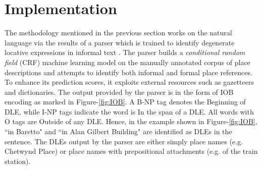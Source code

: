 \documentclass{acm_proc_article-sp}
\begin{document}


\section{Implementation}
The methodology mentioned in the previous section works on the natural language via the results of a parser which is trained to identify degenerate locative expressions in informal text \cite{fei:locative}. 
The parser builds a \textit{conditional random field} (CRF) machine learning model on the manually annotated corpus of place descriptions \cite{tuw} and attempts to identify both informal and formal place references. To enhance its prediction scores, it exploits external resources such as gazetteers and dictionaries. The output provided by the parser is in the form of IOB encoding as marked in Figure-\ref{fig:IOB}. A B-NP tag denotes the Beginning of DLE, while I-NP tags indicate the word is In the span of a DLE. All words with O tags are Outside of any DLE. Hence, in the example shown in Figure-\ref{fig:IOB},  ``in Baretto" and ``in Alan Gilbert Building" are identified as DLEs in the sentence. The DLEs output by the parser are either simply place names (e.g. Chetwynd Place) or place names with prepositional attachments (e.g. of the train station).
\end{document}
